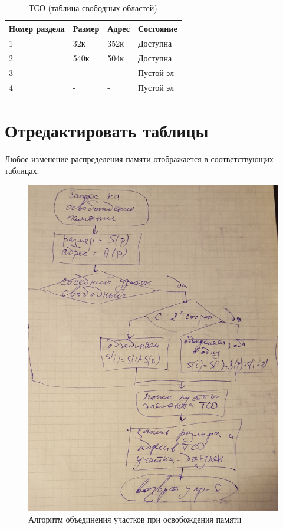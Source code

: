 \begin{table}[H]
\caption{ТСО (таблица свободных областей)}
\begin{tabular}{|l|l|l|l|}
\hline
Номер раздела & Размер & Адрес & Состояние \\
\hline
1 & 32к & 352к & Доступна \\ 
\hline
2 & 540к & 504к & Доступна \\
\hline
3 & - & - & Пустой эл \\
\hline
4 & - & - & Пустой эл\\
\hline
\end{tabular}
\end{table}

\section{Отредактировать таблицы} 

Любое изменение распределения памяти отображается в соответствующих таблицах. 

\begin{figure}[H]
    \centering
    \includegraphics[width=\textwidth]{pic/1.png}
    \caption{Алгоритм объединения участков при освобождения памяти}
\end{figure}

